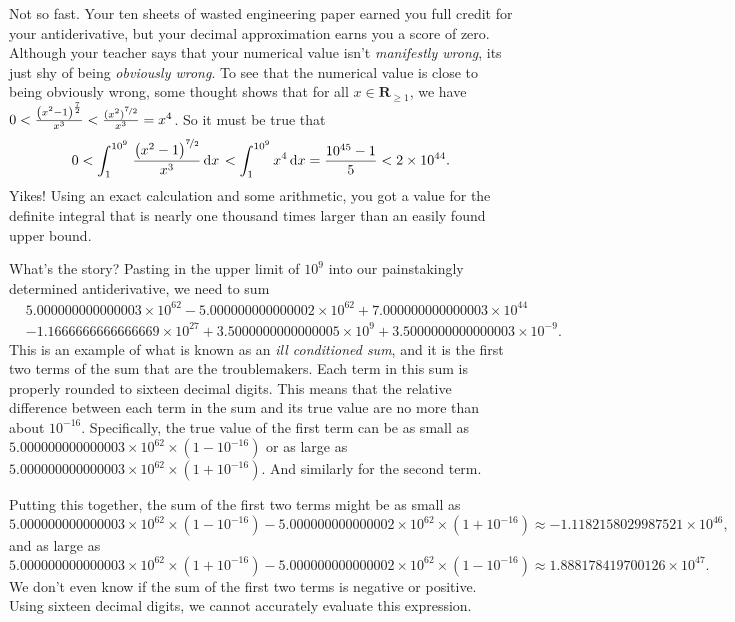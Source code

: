 \documentclass[12pt,fleqn]{article}
\newcommand{\reals}{\mathbf{R}}
\newcounter{ex}\setcounter{ex}{0}
\begin{document}
Not so fast. Your ten sheets of wasted engineering paper earned
you full credit for your antiderivative, but your
decimal approximation earns you a score of zero. Although your teacher says that 
your numerical value isn't \emph{manifestly wrong}, its 
just shy of being \emph{obviously wrong}. To see that the 
numerical value is close to being obviously wrong, some thought 
shows that for all $x \in \reals_{\geq 1}$, we have $0 < \frac{{{\left( {{x}^{2}}-1\right) }^{\frac{7}{2}}}}{{{x}^{3}}}
< \frac{(x^2)^{\nicefrac{7}{2}}} {x^3} = x^4$. So it must be true that
\begin{equation*}
   0 <  \int_1^{10^9} {\left. \frac{{{\left( {{x}^{2}}-1\right) }^{\nicefrac{7}{2}}}}{{{x}^{3}}} \, \mathrm{d}x\right.}
       < \int_1^{10^9} x^4 \, \mathrm{d}x =  \frac{10^{45} - 1 }{5} < 2  \times 10^{44}.
\end{equation*}
Yikes! Using an exact calculation and some arithmetic, you got a
value for the definite integral that is nearly one thousand times larger than
an easily found upper bound.

What's the story?  Pasting in the upper limit of $10^9$ into our 
painstakingly determined antiderivative, we need to sum
\begin{align*}
&5.000000000000003 \times  {{10}^{62}} - 5.000000000000002  \times 
{{10}^{62}} + 7.000000000000003 \times {{10}^{44}}  \\
&-1.1666666666666669 \times {{10}^{27}} + 
3.5000000000000005 \times {{10}^{9}} + 3.5000000000000003 \times {{10}^{-9}}.
\end{align*}
This is an example of what is known as an \emph{ill conditioned sum}, and 
it is the first two terms of the sum that are the 
troublemakers. Each term in this sum is properly rounded to sixteen 
decimal digits. This means that the relative difference between 
each term in the sum and its true value are no more than about 
$10^{-16}$. Specifically, the true value of the first term 
can be as small as $5.000000000000003 \times  {{10}^{62}} \times
(1 - 10^{-16})$ or as large as $5.000000000000003 \times  {{10}^{62}} 
\times (1 + 10^{-16})$. And similarly for the second term.

Putting this together, the sum of the first two terms might be as small
as 
\begin{equation*}
  5.000000000000003 \times 10^{62} \times (1 -  10^{-16}) - 5
   .000000000000002 \times 10^{62} \times  (1  + 10^{-16})
   \approx -1.1182158029987521 \times 10^{46},
\end{equation*}
and as large as 
\begin{equation*}
  5.000000000000003 \times 10^{62} \times (1 + 10^{-16}) - 5
   .000000000000002 \times 10^{62} \times  (1  - 10^{-16})
   \approx 1.888178419700126 \times {{10}^{47}}.
\end{equation*}
We don't even know if the sum of the first two terms is negative 
or positive.  Using sixteen decimal digits, we cannot accurately
evaluate this expression.
\end{document}
